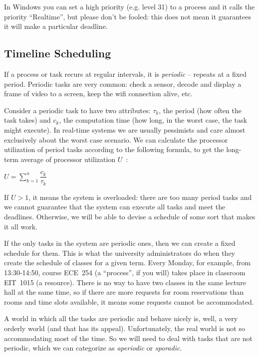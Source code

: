 In Windows you can set a high priority (e.g. level 31) to a process and it calls the priority ``Realtime'', but please don't be fooled: this does not mean it guarantees it will make a particular deadline.

\subsection*{Timeline Scheduling}
If a process or task recurs at regular intervals, it is \textit{periodic} -- repeats at a fixed period. Periodic tasks are very common: check a sensor, decode and display a frame of video to a screen, keep the wifi connection alive, etc.

Consider a periodic task to have two attributes: $\tau_{k}$, the period (how often the task takes) and $c_{k}$, the computation time (how long, in the worst case, the task might execute). In real-time systems we are usually pessimists and care almost exclusively about the worst case scenario. We can calculate the processor utilization of period tasks according to the following formula, to get the long-term average of processor utilization $U$~\cite{mte241}:

\begin{center}
$U = \sum\limits_{k=1}^n\dfrac{c_{k}}{\tau_{k}}$
\end{center}

If $U > 1$, it means the system is overloaded: there are too many period tasks and we cannot guarantee that the system can execute all tasks and meet the deadlines. Otherwise, we will be able to devise a schedule of some sort that makes it all work.

If the only tasks in the system are periodic ones, then we can create a fixed schedule for them. This is what the university administrators do when they create the schedule of classes for a given term. Every Monday, for example, from 13:30-14:50, course ECE~254 (a ``process'', if you will) takes place in classroom EIT~1015 (a resource). There is no way to have two classes in the same lecture hall at the same time, so if there are more requests for room reservations than rooms and time slots available, it means some requests cannot be accommodated.

A world in which all the tasks are periodic and behave nicely is, well, a very orderly world (and that has its appeal). Unfortunately, the real world is not so accommodating most of the time. So we will need to deal with tasks that are not periodic, which we can categorize as \textit{aperiodic} or \textit{sporadic}.

